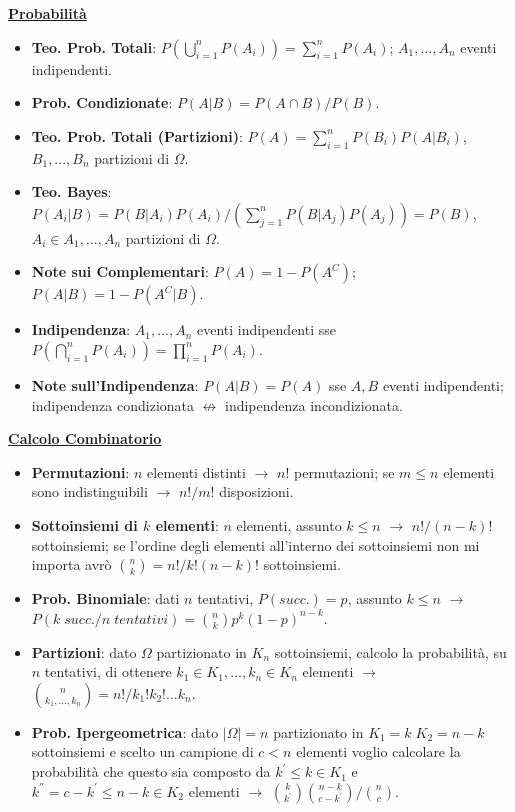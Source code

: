 \documentclass{article}
\begin{document}
\thispagestyle{empty}
\begin{multicols*}{3}

\textbf{\underline{Probabilità}}
\begin{itemize}
    \item \textbf{Teo. Prob. Totali}: $P(\bigcup_{i=1}^{n}P(A_{i}))=\sum_{i=1}^{n}P(A_{i})$; $A_{1},...,A_{n}$ eventi indipendenti.
    \item \textbf{Prob. Condizionate}: $P(A|B)={P(A\cap B)}/{P(B)}$.
    \item \textbf{Teo. Prob. Totali (Partizioni)}: $P(A)=\sum_{i=1}^{n}P(B_{i})P(A|B_{i})$, $B_{1},...,B_{n}$ partizioni di $\Omega$.
    \item \textbf{Teo. Bayes}: $P(A_{i}|B)=P(B|A_{i})P(A_{i})/(\sum_{j=1}^{n}P(B|A_{j})P(A_j))=P(B)$, $A_{i}\in A_{1},...,A_{n}$ partizioni di $\Omega$.
    \item \textbf{Note sui Complementari}: $P(A)=1-P(A^{C})$; $P(A|B)=1-P(A^{C}|B)$.
    \item \textbf{Indipendenza}: $A_{1},...,A_{n}$ eventi indipendenti sse $P(\bigcap_{i=1}^{n}P(A_{i}))=\prod_{i=1}^{n}P(A_{i})$.
    \item \textbf{Note sull'Indipendenza}: $P(A|B)=P(A)$ sse $A, B$ eventi indipendenti; indipendenza condizionata $\nleftrightarrow$ indipendenza incondizionata.
\end{itemize}

\textbf{\underline{Calcolo Combinatorio}}
\begin{itemize}
    \item \textbf{Permutazioni}: $n$ elementi distinti $\rightarrow$ $n!$ permutazioni; se $m\leq n$ elementi sono indistinguibili $\rightarrow$ ${n!}/{m!}$ disposizioni.
    \item \textbf{Sottoinsiemi di $k$ elementi}: $n$ elementi, assunto $k\leq n$ $\rightarrow$ ${n!}/{(n-k)!}$ sottoinsiemi; se l'ordine degli elementi all'interno dei sottoinsiemi non mi importa avrò $\binom{n}{k}={n!}/{k!(n-k)!}$ sottoinsiemi.
    \item \textbf{Prob. Binomiale}: dati $n$ tentativi, $P(succ.)=p$, assunto $k\leq n$ $\rightarrow$ $P({k\; succ.}/{n\; tentativi})=\binom{n}{k}p^{k}(1-p)^{n-k}$.
    \item \textbf{Partizioni}: dato $\Omega$ partizionato in $K_{n}$ sottoinsiemi, calcolo la probabilità, su $n$ tentativi, di ottenere $k_{1}\in K_{1},...,k_{n}\in K_{n}$ elementi $\rightarrow$ $\binom{n}{k_{1},...,k_{n}}={n!}/{k_{1}!k_{2}!...k_{n}}$.
    \item \textbf{Prob. Ipergeometrica}: dato $|\Omega|=n$ partizionato in $K_{1}=k\; K_{2}=n-k$ sottoinsiemi e scelto un campione di $c<n$ elementi voglio calcolare la probabilità che questo sia composto da $k^{'}\leq k\in K_{1}$ e $k^{''} = c-k^{'}\leq n-k\in K_{2}$ elementi $\rightarrow$ ${\binom{k}{k^{'}}\binom{n-k}{c-k^{'}}}/{\binom{n}{c}}$.
\end{itemize}


\end{multicols*}
\end{document}
